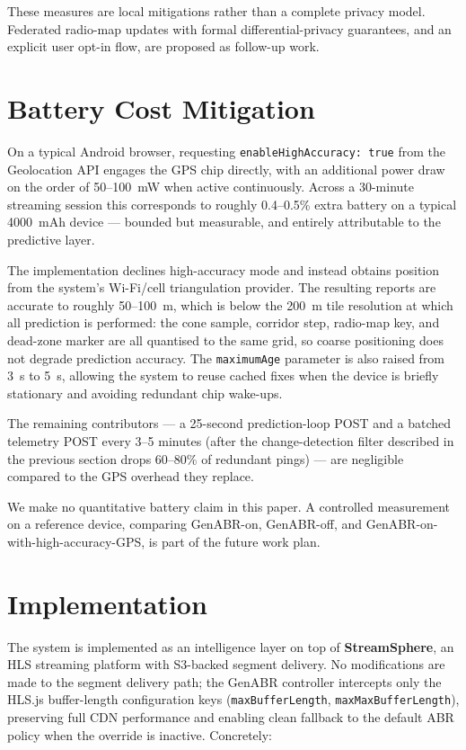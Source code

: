 \documentclass[conference]{IEEEtran}
\begin{document}
These measures are local mitigations rather than a complete privacy
model. Federated radio-map updates with formal differential-privacy
guarantees, and an explicit user opt-in flow, are proposed as follow-up
work.

\section{Battery Cost Mitigation}
On a typical Android browser, requesting
\texttt{enableHighAccuracy: true} from the Geolocation API engages the
GPS chip directly, with an additional power draw on the order of
50--100~mW when active continuously. Across a 30-minute streaming
session this corresponds to roughly 0.4--0.5\% extra battery on a
typical 4000~mAh device --- bounded but measurable, and entirely
attributable to the predictive layer.

The implementation declines high-accuracy mode and instead obtains
position from the system's Wi-Fi/cell triangulation provider. The
resulting reports are accurate to roughly 50--100~m, which is below the
200~m tile resolution at which all prediction is performed: the cone
sample, corridor step, radio-map key, and dead-zone marker are all
quantised to the same grid, so coarse positioning does not degrade
prediction accuracy. The \texttt{maximumAge} parameter is also raised
from 3~s to 5~s, allowing the system to reuse cached fixes when the
device is briefly stationary and avoiding redundant chip wake-ups.

The remaining contributors --- a 25-second prediction-loop POST and a
batched telemetry POST every 3--5 minutes (after the change-detection
filter described in the previous section drops 60--80\% of redundant
pings) --- are negligible compared to the GPS overhead they replace.

We make no quantitative battery claim in this paper. A controlled
measurement on a reference device, comparing GenABR-on, GenABR-off, and
GenABR-on-with-high-accuracy-GPS, is part of the future work plan.

\section{Implementation}
The system is implemented as an intelligence layer on top of
\textbf{StreamSphere}, an HLS streaming platform with S3-backed segment
delivery. No modifications are made to the segment delivery path; the
GenABR controller intercepts only the HLS.js buffer-length configuration
keys (\texttt{maxBufferLength}, \texttt{maxMaxBufferLength}), preserving
full CDN performance and enabling clean fallback to the default ABR
policy when the override is inactive. Concretely:
\end{document}
